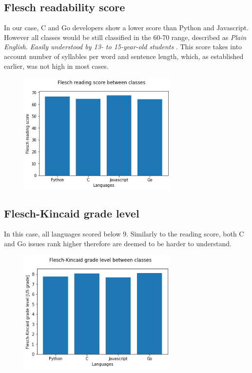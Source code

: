 \documentclass[]{article}
\begin{document}
\subsection{Flesch readability score}

In our case, C and Go developers show a lower score than Python and Javascript. However all classes would be still classified in the 60-70 range, described as {\it Plain English. Easily understood by 13- to 15-year-old students} \cite{flesch}. This score takes into account number of syllables per word and sentence length, which, as established earlier, was not high in most cases.


\begin{figure}[H]
    \includegraphics[width=8cm]{flesch.png}
    \centering
\end{figure}

\subsection{Flesch-Kincaid grade level}

In this case, all languages scored below 9. Similarly to the reading score, both C and Go issues rank higher therefore are deemed to be harder to understand.

\begin{figure}[H]
    \includegraphics[width=8cm]{flesh_kincaid.png}
    \centering
\end{figure}
\end{document}
